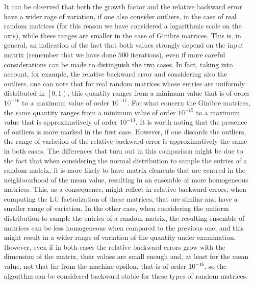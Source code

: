 \documentclass[a4paper,11pt]{report}
\begin{document}
\noindent It can be observed that both the growth factor and the relative backward error have a wider rage of variation, if one also consider outliers, in the case of real random matrices (for this reason we have considered a logarithmic scale on the axis), while these ranges are smaller in the case of Ginibre matrices. This is, in general, an indication of the fact that both values strongly depend on the input matrix (remember that we have done $500$ iterations), even if more careful considerations can be made to distinguish the two cases. In fact, taking into account, for example, the relative backward error and considering also the outliers, one can note that for real random matrices whose entries are uniformly distributed in $\left[0,1\right)$, this quantity ranges from a minimum value that is of order $10^{-16}$ to a maximum value of order $10^{-11}$. For what concern the Ginibre matrices, the same quantity ranges from a minimum value of order $10^{-15}$ to a maximum value that is approximatively of order $10^{-13}$. It is worth noting that the presence of outliers is more marked in the first case. However, if one discards the outliers, the range of variation of the relative backward error is approximatively the same in both cases. The differences that turn out in this comparison might be due to the fact that when considering the normal distribution to sample the entries of a random matrix, it is more likely to have matrix elements that are centred in the neighbourhood of the mean value, resulting in an ensemble of more homogeneous matrices. This, as a consequence, might reflect in relative backward errors, when computing the LU factorization of these matrices, that are similar and have a smaller range of variation. In the other case, when considering the uniform distribution to sample the entries of a random matrix, the resulting ensemble of matrices can be less homogeneous when compared to the previous one, and this might result in a wider range of variation of the quantity under examination. However, even if in both cases the relative backward errors grow with the dimension of the matrix, their values are small enough and, at least for the mean value, not that far from the machine epsilon, that is of order $10^{-16}$, so the algorithm can be considered backward stable for these types of random matrices.\\
\end{document}
